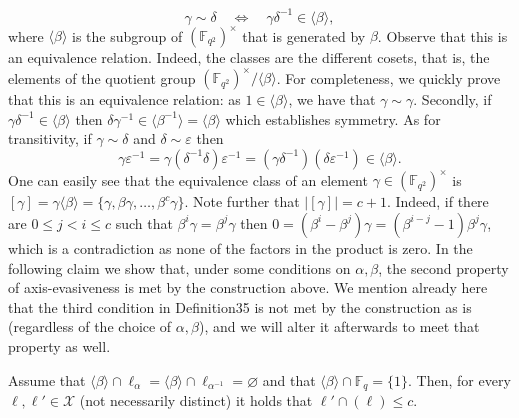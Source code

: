 \begin{equation}\gamma\sim\delta\quad\Longleftrightarrow\quad\gamma\delta^{-1}\in\langle\beta\rangle,\tag{5.1}\end{equation}
where $\langle\beta\rangle$ is the subgroup of $(\mathbb F_{q^2})^\times$ that is generated by $\beta$. Observe that this is an equivalence relation. Indeed, the classes are the different cosets, that is, the elements of the quotient group $(\mathbb F_{q^2})^\times/\langle\beta\rangle$. For completeness, we quickly prove that this is an equivalence relation: as $1\in\langle\beta\rangle$, we have that $\gamma\sim\gamma$. Secondly, if $\gamma\delta^{-1}\in\langle\beta\rangle$ then $\delta\gamma^{-1}\in\langle\beta^{-1}\rangle=\langle\beta\rangle$ which establishes symmetry. As for transitivity, if $\gamma\sim\delta$ and $\delta\sim\varepsilon$ then
\[\gamma\varepsilon^{-1}=\gamma(\delta^{-1}\delta)\varepsilon^{-1}=(\gamma\delta^{-1})(\delta\varepsilon^{-1})\in\langle\beta\rangle.\]
One can easily see that the equivalence class of an element $\gamma\in(\mathbb F_{q^2})^\times$ is $[\gamma]=\gamma\langle\beta\rangle=\{\gamma,\beta\gamma,\ldots,\beta^c\gamma\}$. Note further that $|[\gamma]|=c+1$. Indeed, if there are $0\leq j<i\leq c$ such that $\beta^i\gamma=\beta^j\gamma$ then $0=(\beta^i-\beta^j)\gamma=(\beta^{i-j}-1)\beta^j\gamma$, which is a contradiction as none of the factors in the product is zero.
In the following claim we show that, under some conditions on $\alpha,\beta$, the second property of axis-evasiveness is met by the construction above. We mention already here that the third condition in Definition35 is not met by the construction as is (regardless of the choice of $\alpha,\beta$), and we will alter it afterwards to meet that property as well.
\setcounter{nttheorem}{56}
\begin{ntclaim}
Assume that $\langle\beta\rangle\cap\ell_\alpha=\langle\beta\rangle\cap\ell_{\alpha^{-1}}=\varnothing$ and that $\langle\beta\rangle\cap\mathbb F_q=\{1\}$. Then, for every $\ell,\ell'\in\mathcal X$ (not necessarily distinct) it holds that $\ell'\cap(\ell)\leq c$.
\end{ntclaim}
